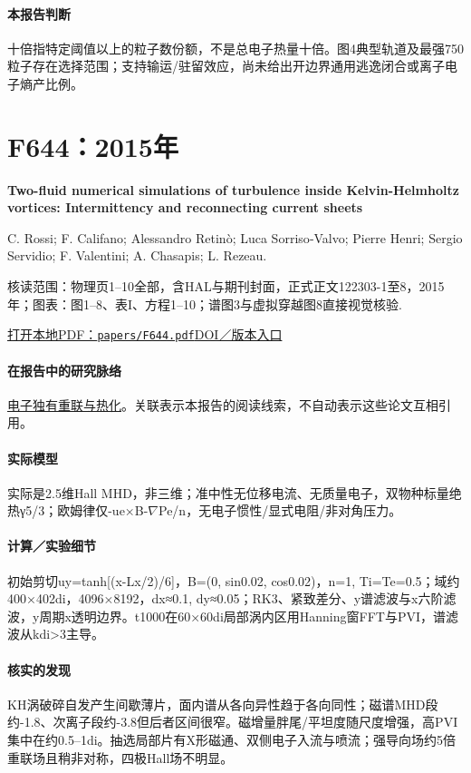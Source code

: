 \documentclass[UTF8,a4paper,11pt,openany,fontset=fandol]{ctexbook}
\begin{document}
\paragraph{本报告判断}十倍指特定阈值以上的粒子数份额，不是总电子热量十倍。图4典型轨道及最强750粒子存在选择范围；支持输运/驻留效应，尚未给出开边界通用逃逸闭合或离子电子熵产比例。

\section{F644：2015年}\label{paper:F644}

\textbf{Two-fluid numerical simulations of turbulence inside Kelvin-Helmholtz vortices: Intermittency and reconnecting current sheets}\citep{F644}\

C. Rossi;  F. Califano;  Alessandro Retinò;  Luca Sorriso‐Valvo;  Pierre Henri;  Sergio Servidio;  F. Valentini;  A. Chasapis;  L. Rezeau.

\textsf{核读范围：}物理页1–10全部，含HAL与期刊封面，正式正文122303-1至8，2015年；\textsf{图表：}图1–8、表I、方程1–10；谱图3与虚拟穿越图8直接视觉核验.

\href{run:../papers/F644.pdf}{打开本地PDF：\texttt{papers/F644.pdf}}\quad\href{https://doi.org/10.1063/1.4936795}{DOI／版本入口}

\paragraph{在报告中的研究脉络}\hyperref[story:energy]{电子独有重联与热化}。关联表示本报告的阅读线索，不自动表示这些论文互相引用。

\paragraph{实际模型}实际是2.5维Hall MHD，非三维；准中性无位移电流、无质量电子，双物种标量绝热γ5/3；欧姆律仅-ue×B-\ensuremath{\nabla}Pe/n，无电子惯性/显式电阻/非对角压力。

\paragraph{计算／实验细节}初始剪切uy=tanh[(x-Lx/2)/6]，B=(0, sin0.02, cos0.02)，n=1, Ti=Te=0.5；域约400×402di，4096×8192，dx≈0.1, dy≈0.05；RK3、紧致差分、y谱滤波与x六阶滤波，y周期x透明边界。t1000在60×60di局部涡内区用Hanning窗FFT与PVI，谱滤波从kdi>3主导。

\paragraph{核实的发现}KH涡破碎自发产生间歇薄片，面内谱从各向异性趋于各向同性；磁谱MHD段约-1.8、次离子段约-3.8但后者区间很窄。磁增量胖尾/平坦度随尺度增强，高PVI集中在约0.5–1di。抽选局部片有X形磁通、双侧电子入流与喷流；强导向场约5倍重联场且稍非对称，四极Hall场不明显。
\end{document}
